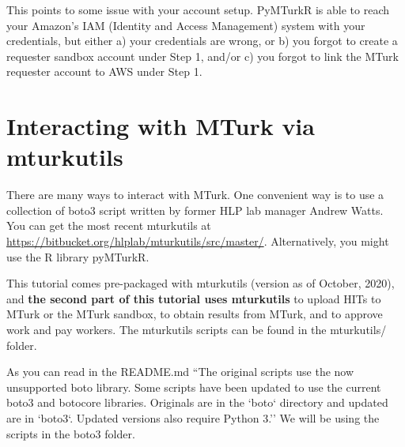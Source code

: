\documentclass{article}
\begin{document}
This points to some issue with your account setup. PyMTurkR is able to reach your Amazon's IAM (Identity and Access Management) system with your credentials, but either a) your credentials are wrong, or b) you forgot to create a requester sandbox account under Step 1, and/or c) you forgot to link the MTurk requester account to AWS under Step 1.





\section{Interacting with MTurk via mturkutils}

There are many ways to interact with MTurk. One convenient way is to use a collection of boto3 script written by former HLP lab manager Andrew Watts. You can get the most recent mturkutils at \url{https://bitbucket.org/hlplab/mturkutils/src/master/}. Alternatively, you might use the R library pyMTurkR. 

This tutorial comes pre-packaged with mturkutils (version as of October, 2020), and {\bf the second part of this tutorial uses mturkutils} to upload HITs to MTurk or the MTurk sandbox, to obtain results from MTurk, and to approve work and pay workers. The mturkutils scripts can be found in the mturkutils/ folder. 

As you can read in the README.md ``The original scripts use the now unsupported boto library. Some scripts have been updated to use the current boto3 and botocore libraries. Originals are in the `boto` directory and updated are in `boto3`. Updated versions also require Python 3.'' We will be using the scripts in the boto3 folder. 


\end{document}
